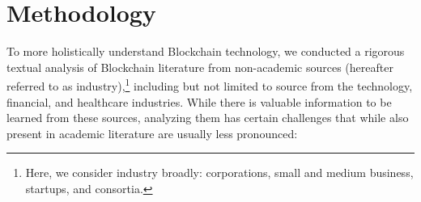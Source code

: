 
\section{Methodology}
\label{sec:method}

To more holistically understand Blockchain technology, we conducted a rigorous textual analysis of Blockchain literature from non-academic sources (hereafter referred to as industry),\footnote{Here, we consider industry broadly: corporations, small and medium business, startups, and consortia.} including but not limited to source from the technology, financial, and healthcare industries.
While there is valuable information to be learned from these sources, analyzing them has certain challenges that while also present in academic literature are usually less pronounced:

